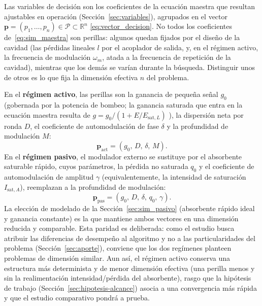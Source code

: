 Las variables de decisión son los coeficientes de la ecuación maestra que resultan
ajustables en operación (Sección~\ref{sec:variables}), agrupados en el vector
$\mathbf{p}=(p_1,\dots,p_n)\in\mathcal{P}\subset\mathbb{R}^n$
\eqref{eq:vector_decision}. No todos los coeficientes de~\eqref{eq:sim_maestra} son
perillas: algunos quedan fijados por el diseño de la cavidad (las pérdidas lineales
$l$ por el acoplador de salida, y, en el régimen activo, la frecuencia de modulación
$\omega_m$, atada a la frecuencia de repetición de la cavidad), mientras que los
demás se varían durante la búsqueda. Distinguir unos de otros es lo que fija la
dimensión efectiva $n$ del problema.

En el \textbf{régimen activo}, las perillas son la ganancia de pequeña señal $g_0$
(gobernada por la potencia de bombeo; la ganancia saturada que entra en la ecuación
maestra resulta de $g=g_0/(1+E/E_{\mathrm{sat},L})$ \cite{Kaertner2020}), la dispersión neta por ronda $D$, el coeficiente de
automodulación de fase $\delta$ y la profundidad de modulación $M$:
%
\begin{equation}
    \mathbf{p}_{\text{act}} = (g_0,\, D,\, \delta,\, M) .
    \label{eq:decision_activo}
\end{equation}
%
En el \textbf{régimen pasivo}, el modulador externo se sustituye por el absorbente
saturable rápido, cuyos parámetros, la pérdida no saturada $q_0$ y el coeficiente de
automodulación de amplitud $\gamma$ (equivalentemente, la intensidad de saturación
$I_{\mathrm{sat},A}$), reemplazan a la profundidad de modulación:
%
\begin{equation}
    \mathbf{p}_{\text{pas}} = (g_0,\, D,\, \delta,\, q_0,\, \gamma) .
    \label{eq:decision_pasivo}
\end{equation}
%
La elección de modelado de la Sección~\ref{sec:sim_pasivo} (absorbente rápido ideal
y ganancia constante) es la que mantiene ambos vectores en una dimensión reducida y
comparable. Esta paridad es deliberada: como el estudio busca atribuir las
diferencias de desempeño al algoritmo y no a las particularidades del problema
(Sección~\ref{sec:aporte}), conviene que los dos regímenes planteen problemas de
dimensión similar. Aun así, el régimen activo conserva una estructura más
determinista y de menor dimensión efectiva (una perilla menos y sin la
realimentación intensidad\-/pérdida del absorbente), rasgo que la hipótesis de
trabajo (Sección~\ref{sec:hipotesis-alcance}) asocia a una convergencia más rápida y
que el estudio comparativo pondrá a prueba.

